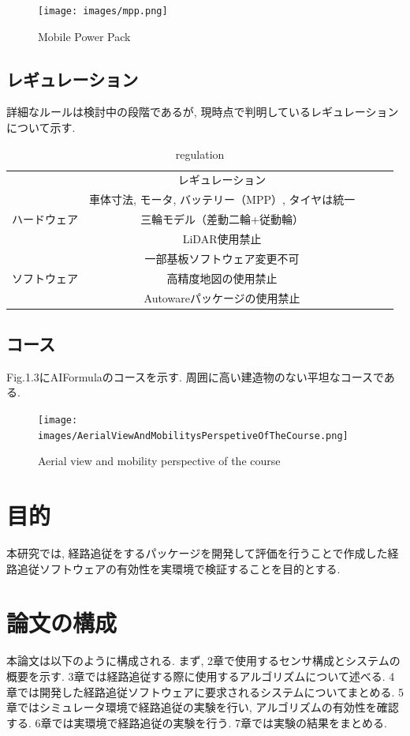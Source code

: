 \begin{figure}[H]
  \centering
 \texttt{[image: images/mpp.png]}
 \caption{Mobile Power Pack}
 \label{fig:MPP}
\end{figure}

\subsection{レギュレーション}
詳細なルールは検討中の段階であるが, 現時点で判明しているレギュレーションについて示す.

\begin{table}[H]
     \centering
     \caption{regulation}
     \begin{tabular}{|c|c|lll}
     \cline{1-2}
                              & レギュレーション              &  &  &  \\ \cline{1-2}
                                   & 車体寸法, モータ, バッテリー（MPP）, タイヤは統一 &  &  &  \\
     ハードウェア                       & 三輪モデル（差動二輪+従動輪）               &  &  &  \\
                                   & LiDAR使用禁止                     &  &  &  \\
                                   & 一部基板ソフトウェア変更不可                &  &  &  \\ \cline{1-2}
     \multicolumn{1}{|l|}{ソフトウェア} & 高精度地図の使用禁止                    &  &  &  \\
     \multicolumn{1}{|l|}{}       & Autowareパッケージの使用禁止            &  &  &  \\ \cline{1-2}
     \end{tabular}
\end{table}

\subsection{コース}
Fig.1.3にAIFormulaのコースを示す.
周囲に高い建造物のない平坦なコースである.


\begin{figure}[H]
  \centering
 \texttt{[image: images/AerialViewAndMobilitysPerspetiveOfTheCourse.png]}
 \caption{Aerial view and mobility perspective of the course}
 \label{fig:course}
\end{figure}


\section{目的}
本研究では, 経路追従をするパッケージを開発して評価を行うことで作成した経路追従ソフトウェアの有効性を実環境で検証することを目的とする.


\section{論文の構成}
本論文は以下のように構成される.
まず, 2章で使用するセンサ構成とシステムの概要を示す.
3章では経路追従する際に使用するアルゴリズムについて述べる.
4章では開発した経路追従ソフトウェアに要求されるシステムについてまとめる.
5章ではシミュレータ環境で経路追従の実験を行い, アルゴリズムの有効性を確認する.
6章では実環境で経路追従の実験を行う.
7章では実験の結果をまとめる.

\newpage

